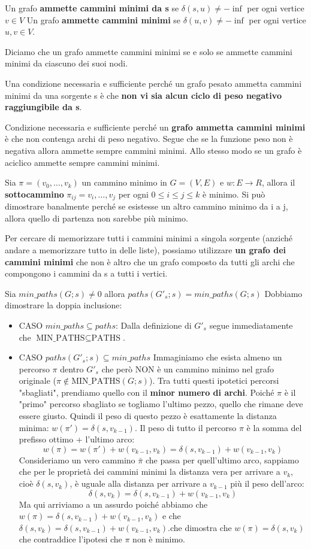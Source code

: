 Un grafo \textbf{ammette cammini minimi da s} se $\delta(s,u)\neq - \inf$ per ogni vertice $v \in V$
Un grafo \textbf{ammette cammini minimi} se $\delta(u,v)\neq - \inf$ per ogni vertice $u,v \in V$. 

Diciamo che un grafo ammette cammini minimi se e solo se ammette cammini minimi da ciascuno dei suoi nodi. 

Una condizione necessaria e sufficiente perché un grafo pesato ammetta cammini minimi da una sorgente s è che \textbf{non vi sia alcun ciclo di peso negativo raggiungibile da s}.

Condizione necessaria e sufficiente perché un \textbf{grafo ammetta cammini minimi} è che non contenga archi di peso negativo. Segue che se la funzione peso non è negativa allora ammette sempre cammini minimi. Allo stesso modo se un grafo è aciclico ammette sempre cammini minimi. 

Sia $\pi=(v_0,\dots, v_k)$ un cammino minimo in $G=(V,E)$ e $w:E\rightarrow R$, allora il \textbf{sottocammino} $\pi_{ij}=v_i,\dots, v_j$ per ogni $0\leq i \leq j \leq k$ è minimo. Si può dimostrare banalmente perché se esistesse un altro cammino minimo da i a j, allora quello di partenza non sarebbe più minimo.

Per cercare di memorizzare tutti i cammini minimi a singola sorgente (anziché andare a memorizzare tutto in delle liste), possiamo utilizzare \textbf{un grafo dei cammini minimi} che non è altro che un grafo composto da tutti gli archi che compongono i cammini da s a tutti i vertici.

Sia $min\_paths(G;s)\neq 0$ allora $paths(G'_s;s)=min\_paths(G;s)$ Dobbiamo dimostrare la doppia inclusione:
\begin{itemize}
    \item CASO $min\_paths \subseteq paths$: Dalla definizione di $G'_s$ segue immediatamente che $\text{MIN\_PATHS} \subseteq \text{PATHS}$.
    \item CASO $paths(G'_s;s) \subseteq min\_paths$ Immaginiamo che esista almeno un percorso $\pi$ dentro $G'_s$ che però NON è un cammino minimo nel grafo originale ($\pi \notin \text{MIN\_PATHS}(G; s)$). Tra tutti questi ipotetici percorsi "sbagliati", prendiamo quello con il \textbf{minor numero di archi}.
    Poiché $\pi$ è il "primo" percorso sbagliato se togliamo l'ultimo pezzo, quello che rimane deve essere giusto. Quindi il peso di questo pezzo è esattamente la distanza minima: $w(\pi') = \delta(s, v_{k-1})$. Il peso di tutto il percorso $\pi$ è la somma del prefisso ottimo + l'ultimo arco:
    \[w(\pi) = w(\pi') + w(v_{k-1}, v_k) = \delta(s, v_{k-1}) + w(v_{k-1}, v_k)\]
    Consideriamo un vero cammino $\bar{\pi}$ che passa per quell'ultimo arco, sappiamo che per le proprietà dei cammini minimi la distanza vera per arrivare a $v_k$, cioè $\delta(s, v_k)$, è uguale alla distanza per arrivare a $v_{k-1}$ più il peso dell'arco:
    \[\delta(s, v_k) = \delta(s, v_{k-1}) + w(v_{k-1}, v_k)\]
    Ma qui arriviamo a un assurdo poiché abbiamo che $w(\pi) = \delta(s, v_{k-1}) + w(v_{k-1}, v_k)$ e che $\delta(s, v_k) = \delta(s, v_{k-1}) + w(v_{k-1}, v_k)$.che dimostra che $w(\pi) = \delta(s, v_k)$ che contraddice l'ipotesi che $\pi$ non è minimo.
\end{itemize}

